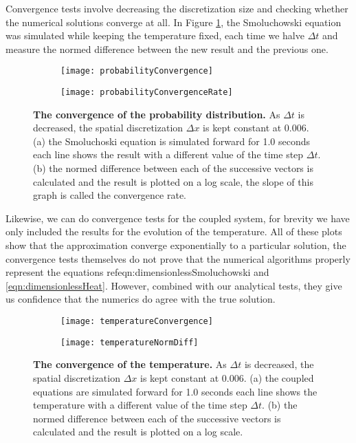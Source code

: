 Convergence tests involve decreasing the discretization size and checking whether the numerical solutions converge at all. In Figure \ref{fig:Convergence}, the Smoluchowski equation was simulated while keeping the temperature fixed, each time we halve $\Delta t$ and measure the normed difference between the new result and the previous one.


\begin{figure}
	\begin{subfigure}{0.49\textwidth}
		\texttt{[image: probabilityConvergence]}
	\end{subfigure}
	\begin{subfigure}{0.49\textwidth}
		\texttt{[image: probabilityConvergenceRate]}
	\end{subfigure}
\caption{\textbf{The convergence of the probability distribution.} As $\Delta t$ is decreased, the spatial discretization $\Delta x$ is kept constant at 0.006. (a) the Smoluchoski equation is simulated forward for 1.0 seconds each line shows the result with a different value of the time step $\Delta t$. (b) the normed difference between each of the successive vectors is calculated and the result is plotted on  a log scale, the slope of this graph is called the convergence rate.}
\label{fig:Convergence}
\end{figure}

Likewise, we can do convergence tests for the coupled system, for brevity we have only included the results for the evolution of the temperature. All of these plots show that the approximation converge exponentially to a particular solution, the convergence tests themselves do not prove that the numerical algorithms properly represent the equations ref{eqn:dimensionlessSmoluchowski} and \ref{eqn:dimensionlessHeat}. However, combined with our analytical tests, they give us confidence that the numerics do agree with the true solution.

\begin{figure}
	\begin{subfigure}{0.49\textwidth}
		\texttt{[image: temperatureConvergence]}
	\end{subfigure}
	\begin{subfigure}{0.49\textwidth}
		\texttt{[image: temperatureNormDiff]}
	\end{subfigure}
\caption{\textbf{The convergence of the temperature.} As $\Delta t$ is decreased, the spatial discretization $\Delta x$ is kept constant at 0.006. (a) the coupled equations are simulated forward for 1.0 seconds each line shows the temperature with a different value of the time step $\Delta t$. (b) the normed difference between each of the successive vectors is calculated and the result is plotted on  a log scale.}
\label{fig:temperatureConvergence}
\end{figure}

